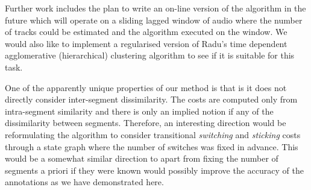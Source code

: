 \documentclass[twocolumn]{article}
\begin{document}
Further work includes the plan to write an on-line version of the algorithm in the future which will operate on a sliding lagged window of audio where the number of tracks could be estimated and the algorithm executed on the window. We would also like to implement a regularised version of Radu's time dependent agglomerative (hierarchical) clustering algorithm \citep{radu} to see if it is suitable for this task. 

One of the apparently unique properties of our method is that is it does not directly consider inter-segment dissimilarity. The costs are computed only from intra-segment similarity and there is only an implied notion if any of the dissimilarity between segments. Therefore, an interesting direction would be reformulating the algorithm to consider transitional \textit{switching} and \textit{sticking} costs through a state graph where the number of switches was fixed in advance. This would be a somewhat similar direction to \citep{goodwin2003audio,goodwin2004dynamic} apart from fixing the number of segments a priori if they were known would possibly improve the accuracy of the annotations as we have demonstrated here.
\end{document}
